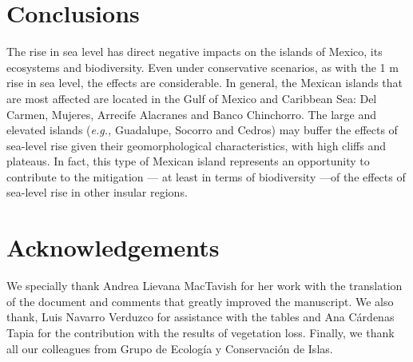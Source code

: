 \documentclass{article} %
\begin{document}
\section{Conclusions}

The rise in sea level has direct negative impacts on the islands of Mexico, its
ecosystems and biodiversity. Even under conservative scenarios, as with the 1 m rise
in sea level, the effects are considerable. In general, the Mexican islands that are
most affected are located in the Gulf of Mexico and Caribbean Sea: Del Carmen,
Mujeres, Arrecife Alacranes and Banco Chinchorro. The large and elevated islands
(\textit{e.g.,} Guadalupe, Socorro and Cedros) may buffer the effects of sea-level rise given
their geomorphological characteristics, with high cliffs and plateaus. In fact, this type
of Mexican island represents an opportunity to contribute to the mitigation — at least
in terms of biodiversity —of the effects of sea-level rise in other insular regions.



\section{Acknowledgements}

We specially thank Andrea Lievana MacTavish for her work with the translation of the
document and comments that greatly improved the manuscript. We also thank, Luis
Navarro Verduzco for assistance with the tables and Ana Cárdenas Tapia for the
contribution with the results of vegetation loss. Finally, we thank all our colleagues
from Grupo de Ecología y Conservación de Islas. 
\end{document}
